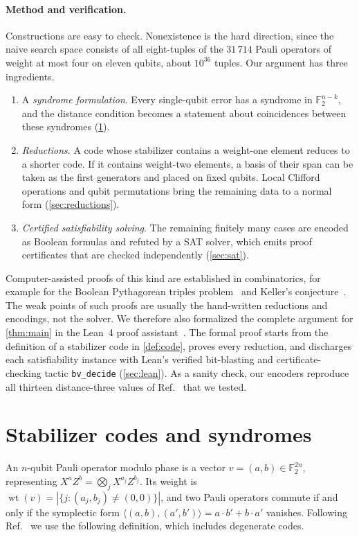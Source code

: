 \documentclass[a4paper,onecolumn,unpublished]{quantumarticle}
\theoremstyle{definition}
\theoremstyle{remark}
\newcommand{\F}{\mathbb{F}_2}
\newcommand{\wt}{\operatorname{wt}}
\begin{document}
\paragraph{Method and verification.}
Constructions are easy to check. Nonexistence is the hard direction, since the naive search
space consists of all eight-tuples of the $31\,714$ Pauli operators of weight at most four on
eleven qubits, about $10^{36}$ tuples. Our argument has three ingredients.
\begin{enumerate}
\item A \emph{syndrome formulation}. Every single-qubit error has a syndrome in $\F^{n-k}$, and the
distance condition becomes a statement about coincidences between these syndromes
(\cref{sec:syndromes}).
\item \emph{Reductions}. A code whose stabilizer contains a weight-one element reduces to a
shorter code. If it contains weight-two elements, a basis of their span can be taken as the first
generators and placed on fixed qubits. Local Clifford operations and qubit permutations bring the
remaining data to a normal form (\cref{sec:reductions}).
\item \emph{Certified satisfiability solving}. The remaining finitely many cases are encoded as
Boolean formulas and refuted by a SAT solver, which emits proof certificates that are checked
independently (\cref{sec:sat}).
\end{enumerate}
Computer-assisted proofs of this kind are established in combinatorics, for example for the
Boolean Pythagorean triples problem~\cite{HKM16} and Keller's conjecture~\cite{BHMN20}. The weak
points of such proofs are usually the hand-written reductions and encodings, not the solver. We
therefore also formalized the complete argument for \cref{thm:main} in the Lean~4 proof
assistant~\cite{Lean4,Mathlib}. The formal proof starts from the definition of a stabilizer code in
\cref{def:code}, proves every reduction, and discharges each satisfiability instance with Lean's
verified bit-blasting and certificate-checking tactic \texttt{bv\_decide}
(\cref{sec:lean}). As a sanity check, our encoders reproduce all thirteen distance-three values
of Ref.~\cite{WHHLL26} that we tested.

\section{Stabilizer codes and syndromes}
\label{sec:syndromes}

An $n$-qubit Pauli operator modulo phase is a vector $v=(a,b)\in\F^{2n}$, representing
$X^aZ^b=\bigotimes_jX^{a_j}Z^{b_j}$. Its weight is $\wt(v)=|\{j:(a_j,b_j)\ne(0,0)\}|$, and two
Pauli operators commute if and only if the symplectic form
$\langle(a,b),(a',b')\rangle=a\cdot b'+b\cdot a'$ vanishes. Following Ref.~\cite{QIQCOP} we use the
following definition, which includes degenerate codes.
\end{document}
